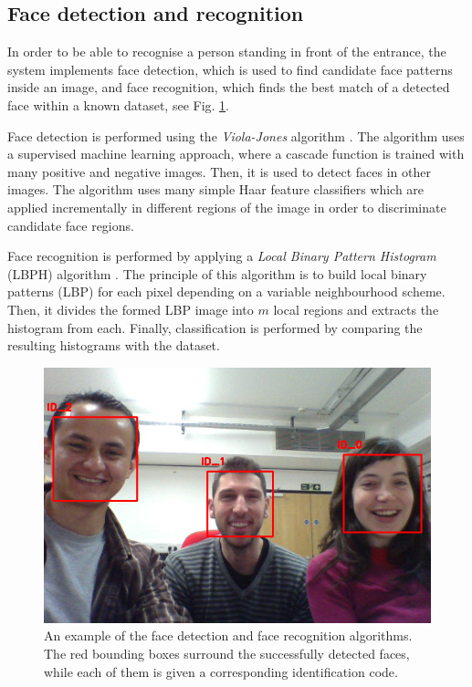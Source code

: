 \documentclass[conference]{IEEEtran}
\begin{document}
\subsection{\label{sec:vision}Face detection and recognition}
In order to be able to recognise a person standing in front of the entrance, the system implements face detection, which is used to find candidate face patterns inside an image, and face recognition, which finds the best match of a detected face within a known dataset, see Fig. \ref{fig:face}.

Face detection is performed using the \textit{Viola-Jones} algorithm \cite{Viola01_RapidObjDet}. The algorithm uses a supervised machine learning approach, where a cascade function is trained with many positive and negative images. Then, it is used to detect faces in other images. The algorithm uses many simple Haar feature classifiers which are applied incrementally in different regions of the image in order to discriminate candidate face regions.

Face recognition is performed by applying a \textit{Local Binary Pattern Histogram} (LBPH) algorithm \cite{Ahonen04_FaceRecLBP}. The principle of this algorithm is to build local binary patterns (LBP) for each pixel depending on a variable neighbourhood scheme. Then, it divides the formed LBP image into $m$ local regions and extracts the histogram from each. Finally, classification is performed by comparing the resulting histograms with the dataset.%

\begin{figure}[!t]
\centering
\includegraphics[width=3.in]{BARC_FaceRec.png}
\caption{An example of the face detection and face recognition algorithms. The red bounding boxes surround the successfully detected faces, while each of them is given a corresponding identification code.}
\label{fig:face}
\end{figure}
\end{document}

